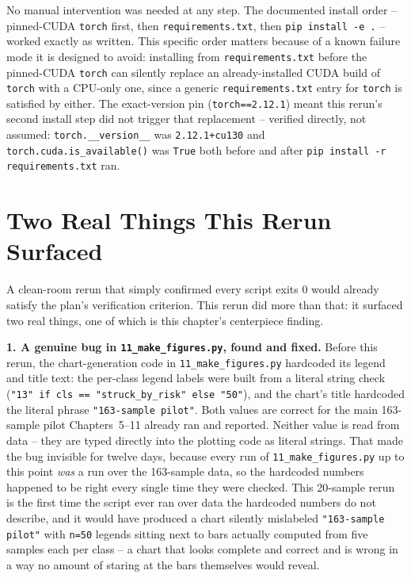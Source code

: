 No manual intervention was needed at any step. The documented install order -- pinned-CUDA
\texttt{torch} first, then \texttt{requirements.txt}, then \texttt{pip install -e .} -- worked
exactly as written. This specific order matters because of a known failure mode it is designed to
avoid: installing from \texttt{requirements.txt} before the pinned-CUDA \texttt{torch} can silently
replace an already-installed CUDA build of \texttt{torch} with a CPU-only one, since a generic
\texttt{requirements.txt} entry for \texttt{torch} is satisfied by either. The exact-version pin
(\texttt{torch==2.12.1}) meant this rerun's second install step did not trigger that replacement --
verified directly, not assumed: \texttt{torch.\_\_version\_\_} was \texttt{2.12.1+cu130} and
\texttt{torch.cuda.is\_available()} was \texttt{True} both before and after \texttt{pip install -r
requirements.txt} ran.

\section{Two Real Things This Rerun Surfaced}

A clean-room rerun that simply confirmed every script exits 0 would already satisfy the plan's
verification criterion. This rerun did more than that: it surfaced two real things, one of which is
this chapter's centerpiece finding.

\textbf{1. A genuine bug in \texttt{11\_make\_figures.py}, found and fixed.} Before this rerun, the
chart-generation code in \texttt{11\_make\_figures.py} hardcoded its legend and title text:
the per-class legend labels were built from a literal string check (\texttt{"13" if cls ==
"struck\_by\_risk" else "50"}), and the chart's title hardcoded the literal phrase
\texttt{"163-sample pilot"}. Both values are correct for the main 163-sample pilot Chapters~5--11
already ran and reported. Neither value is read from data -- they are typed directly into the
plotting code as literal strings. That made the bug invisible for twelve days, because every run of
\texttt{11\_make\_figures.py} up to this point \emph{was} a run over the 163-sample data, so the
hardcoded numbers happened to be right every single time they were checked. This 20-sample rerun is
the first time the script ever ran over data the hardcoded numbers do not describe, and it would have
produced a chart silently mislabeled \texttt{"163-sample pilot"} with \texttt{n=50} legends sitting
next to bars actually computed from five samples each per class -- a chart that looks complete and
correct and is wrong in a way no amount of staring at the bars themselves would reveal.

